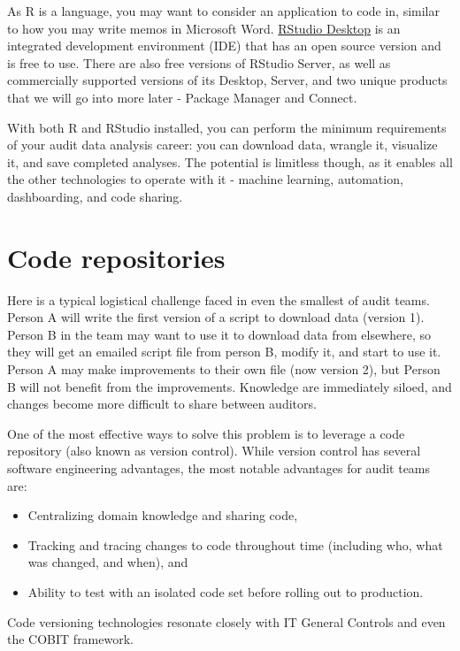 \documentclass[
]{book}
\providecommand{\tightlist}{%
  \setlength{\itemsep}{0pt}\setlength{\parskip}{0pt}}
\begin{document}
As R is a language, you may want to consider an application to code in, similar to how you may write memos in Microsoft Word. \href{https://rstudio.com}{RStudio Desktop} is an integrated development environment (IDE) that has an open source version and is free to use. There are also free versions of RStudio Server, as well as commercially supported versions of its Desktop, Server, and two unique products that we will go into more later - Package Manager and Connect.

With both R and RStudio installed, you can perform the minimum requirements of your audit data analysis career: you can download data, wrangle it, visualize it, and save completed analyses. The potential is limitless though, as it enables all the other technologies to operate with it - machine learning, automation, dashboarding, and code sharing.

\hypertarget{code-repositories}{%
\section{Code repositories}\label{code-repositories}}

Here is a typical logistical challenge faced in even the smallest of audit teams. Person A will write the first version of a script to download data (version 1). Person B in the team may want to use it to download data from elsewhere, so they will get an emailed script file from person B, modify it, and start to use it. Person A may make improvements to their own file (now version 2), but Person B will not benefit from the improvements. Knowledge are immediately siloed, and changes become more difficult to share between auditors.

One of the most effective ways to solve this problem is to leverage a code repository (also known as version control). While version control has several software engineering advantages, the most notable advantages for audit teams are:

\begin{itemize}
\tightlist
\item
  Centralizing domain knowledge and sharing code,
\item
  Tracking and tracing changes to code throughout time (including who, what was changed, and when), and
\item
  Ability to test with an isolated code set before rolling out to production.
\end{itemize}

Code versioning technologies resonate closely with IT General Controls and even the COBIT framework.
\end{document}
